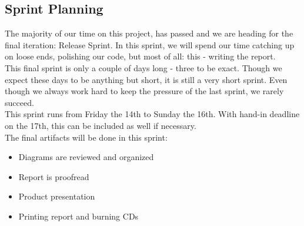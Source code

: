 \subsection{Sprint Planning}
The majority of our time on this project, has passed and we are heading for the final iteration: Release Sprint. In this sprint, we will spend our time catching up on loose ends, polishing our code, but most of all: this - writing the report.\\
This final sprint is only a couple of days long - three to be exact. Though we expect these days to be anything but short, it is still a very short sprint. Even though we always work hard to keep the pressure of the last sprint, we rarely succeed.\\
This sprint runs from Friday the 14th to Sunday the 16th. With hand-in deadline on the 17th, this can be included as well if necessary.\\
The final artifacts will be done in this sprint: 
\begin{itemize}
\item Diagrams are reviewed and organized
\item Report is proofread
\item Product presentation 
\item Printing report and burning CDs
\end{itemize}